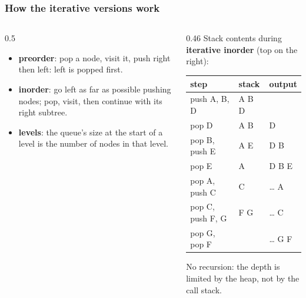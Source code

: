 \documentclass[aspectratio=169,10pt,compress]{beamer}
\begin{document}
\begin{frame}[t,fragile] \frametitle{How the iterative versions work}
  \begin{columns}[T]
    \begin{column}{0.5\textwidth}
      \begin{itemize}\small
        \item \textbf{preorder}: pop a node, visit it, push right then left: left is popped first.
        \item \textbf{inorder}: go left as far as possible pushing nodes; pop, visit, then continue with its right subtree.
        \item \textbf{levels}: the queue's size at the start of a level is the number of nodes in that level.
      \end{itemize}
    \end{column}
    \begin{column}{0.46\textwidth}
      \small Stack contents during \textbf{iterative inorder} (top on the right):
      \begin{center}\scriptsize
      \begin{tabular}{lll}
        \toprule
        \textbf{step}             & \textbf{stack}    & \textbf{output} \\
        \midrule
        push A, B, D              & A B D             & \\
        pop D                     & A B               & D \\
        pop B, push E             & A E               & D B \\
        pop E                     & A                 & D B E \\
        pop A, push C             & C                 & \dots{} A \\
        pop C, push F, G          & F G               & \dots{} C \\
        pop G, pop F              &                   & \dots{} G F \\
        \bottomrule
      \end{tabular}
      \end{center}
      \small No recursion: the depth is limited by the heap, not by the call stack.
    \end{column}
  \end{columns}
\end{frame}
\end{document}
